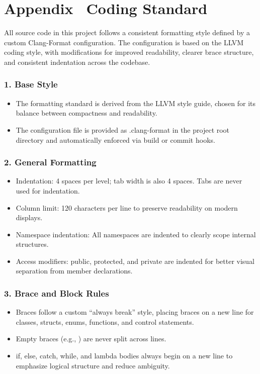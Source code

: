 \section*{Appendix \thesection \, \textbar \vspace{0.5em} Coding Standard}
\label{sec:appendix-coding-standard}

All source code in this project follows a consistent formatting style defined by a custom Clang-Format configuration.
The configuration is based on the LLVM coding style, with modifications for improved readability, clearer brace structure, and consistent indentation across the codebase.
\subsubsection*{1. Base Style}
\begin{itemize}
\item
The formatting standard is derived from the LLVM style guide, chosen for its balance between compactness and readability.
\item
The configuration file is provided as .clang-format in the project root directory and automatically enforced via build or commit hooks.
\end{itemize}
\subsubsection*{2. General Formatting}
\begin{itemize}
    \item
    Indentation: 4 spaces per level; tab width is also 4 spaces. Tabs are never used for indentation.
    \item
    Column limit: 120 characters per line to preserve readability on modern displays.
    \item
    Namespace indentation: All namespaces are indented to clearly scope internal structures.
    \item
    Access modifiers: public, protected, and private are indented for better visual separation from member declarations.
\end{itemize}
\subsubsection*{3. Brace and Block Rules}
\begin{itemize}
    \item
    Braces follow a custom “always break” style, placing braces on a new line for classes, structs, enums, functions, and control statements.
    \item
    Empty braces (e.g., {}) are never split across lines.
    \item
    if, else, catch, while, and lambda bodies always begin on a new line to emphasize logical structure and reduce ambiguity.
\end{itemize}
